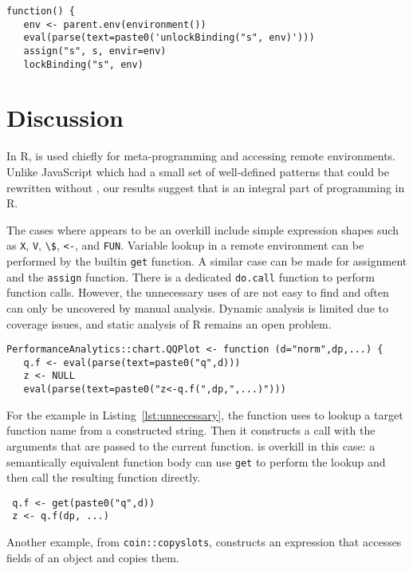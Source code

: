 \documentclass[acmsmall, screen]{acmart}
\renewcommand{\k}[1]{\lstinline |#1|\xspace}
\begin{document}
\begin{lstlisting}[caption={\k{aibd::scalaEnsure}}, captionpos=b]
 function() {
   env <- parent.env(environment())
   eval(parse(text=paste0('unlockBinding("s", env)')))
   assign("s", s, envir=env)
   lockBinding("s", env)
\end{lstlisting}\medskip

\section{Discussion}


In R, \eval is used chiefly for meta-programming and accessing remote
environments. Unlike JavaScript which had a small set of well-defined patterns
that could be rewritten without \eval, our results suggest that \eval is an
integral part of programming in R.

The cases where \eval appears to be an overkill include simple expression shapes
such as \k{X}, \k{V}, \k{\$}, \k{<-}, and \k{FUN}. Variable lookup in a remote
environment can be performed by the builtin \k{get} function. A similar case can
be made for assignment and the \k{assign} function. There is a dedicated
\k{do.call} function to perform function calls. However, the unnecessary uses of
\eval are not easy to find and often can only be uncovered by manual analysis.
Dynamic analysis is limited due to coverage issues, and static analysis of R
remains an open problem.


\begin{lstlisting}[caption={Unnecessary use of \eval},label=lst:unnecessary]
 PerformanceAnalytics::chart.QQPlot <- function (d="norm",dp,...) {
   q.f <- eval(parse(text=paste0("q",d)))
   z <- NULL
   eval(parse(text=paste0("z<-q.f(",dp,",...)")))
\end{lstlisting}

For the example in Listing~\ref{lst:unnecessary}, the function uses \eval to
lookup a target function name from a constructed string. Then it constructs a
call with the arguments that are passed to the current function. \Eval is
overkill in this case: a semantically equivalent function body can use \k{get}
to perform the lookup and then call the resulting function directly.

\begin{lstlisting}
 q.f <- get(paste0("q",d))
 z <- q.f(dp, ...)
\end{lstlisting}

Another example, from \k{coin::copyslots}, constructs an expression that accesses
fields of an object and copies them.
\end{document}
